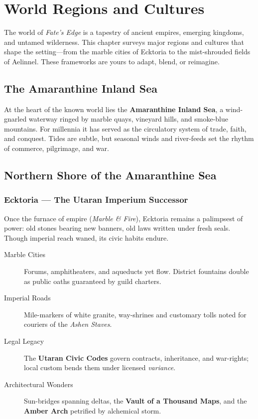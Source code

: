 \chapter{World Regions and Cultures}
\label{ch:world-regions}

The world of \textit{Fate's Edge} is a tapestry of ancient empires, emerging kingdoms, and untamed wilderness. This chapter surveys major regions and cultures that shape the setting---from the marble cities of Ecktoria to the mist-shrouded fields of Aelinnel. These frameworks are yours to adapt, blend, or reimagine.

\section{The Amaranthine Inland Sea}

At the heart of the known world lies the \textbf{Amaranthine Inland Sea}, a wind-gnarled waterway ringed by marble quays, vineyard hills, and smoke-blue mountains. For millennia it has served as the circulatory system of trade, faith, and conquest. Tides are subtle, but seasonal winds and river-feeds set the rhythm of commerce, pilgrimage, and war.

\section{Northern Shore of the Amaranthine Sea}

\subsection*{Ecktoria — The Utaran Imperium Successor}

Once the furnace of empire (\emph{Marble \& Fire}), Ecktoria remains a palimpsest of power: old stones bearing new banners, old laws written under fresh seals. Though imperial reach waned, its civic habits endure.

\begin{description}
\item[Marble Cities] Forums, amphitheaters, and aqueducts yet flow. District fountains double as public oaths guaranteed by guild charters.
\item[Imperial Roads] Mile-markers of white granite, way-shrines and customary tolls noted for couriers of the \emph{Ashen Staves}.
\item[Legal Legacy] The \textbf{Utaran Civic Codes} govern contracts, inheritance, and war-rights; local custom bends them under licensed \emph{variance}.
\item[Architectural Wonders] Sun-bridges spanning deltas, the \textbf{Vault of a Thousand Maps}, and the \textbf{Amber Arch} petrified by alchemical storm.
\end{description}

